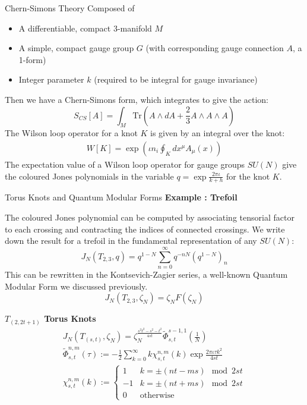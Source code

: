 \documentclass[final,10pt]{beamer}
\newlength{\colwidth}
\begin{document}
\begin{frame}[t]
\begin{columns}[t]
\begin{column}{\colwidth}
\begin{block}{Chern-Simons Theory}
    Composed of 
\begin{itemize}
    \item A differentiable, compact 3-manifold $M$
    \item A simple, compact gauge group $G$ (with corresponding gauge connection $A$, a 1-form) 
    \item Integer parameter $k$ (required to be integral for gauge invariance)
\end{itemize}
Then we have a Chern-Simons form, which integrates to give the action:
\begin{equation}
    S_{CS}[A] = \int _M\text{Tr}(A\wedge dA +\frac 23 A\wedge A\wedge A)
\end{equation}
The Wilson loop operator for a knot $K$ is given by an integral over the knot:
\begin{gather}
    W[K] = \exp \left(\iota n_i \oint_{K} dx^\mu A_\mu(x) \right)
\end{gather}
The expectation value of a Wilson loop operator for gauge groups $SU(N)$ give the coloured Jones polynomials in the variable $q=\exp\frac{2\pi\iota}{k+h}$ for the knot $K$.

\end{block}



\begin{block}{Torus Knots and Quantum Modular Forms}
\textbf{Example : Trefoil}

The coloured Jones polynomial can be computed by associating tensorial factor to each crossing and contracting the indices of connected crossings. We write down the result for a trefoil in the fundamental representation of any $SU(N)$:
\begin{equation}
    J_N(T_{2,3},q) = q^{1-N} \sum_{n=0}^\infty q^{-nN}(q^{1-N})_n
\end{equation}
This can be rewritten in the Kontsevich-Zagier series, a well-known Quantum Modular Form we discussed previously.
\begin{equation}
    J_N(T_{2,3},\zeta_N)=\zeta_NF(\zeta_N)
\end{equation}

\textbf{$T_{(2,2t+1)}$ Torus Knots}
\begin{gather}
    J_N(T_{(s,t)},\zeta_N) = \zeta_N^{\frac{s^2t^2-s^2-t^2}{4st}} \tilde\Phi_{s,t}^{s-1,1}(\tfrac 1 N)\\
    \tilde\Phi_{s,t}^{n,m}(\tau) := -\frac 12 \sum\limits_{k=0}^\infty k \chi_{s,t}^{n,m}(k) \exp\frac{2\pi \iota\tau  k^2}{4st}\\
    \chi_{s,t}^{n,m}(k) := \begin{cases}
        1 & k=\pm(nt-ms)\mod 2st\\
    -1 & k = \pm (nt+ms) \mod 2st\\
0 & \text{otherwise} \end{cases}
\end{gather}


\end{block}
\end{column}
\end{columns}
\end{frame}
\end{document}
